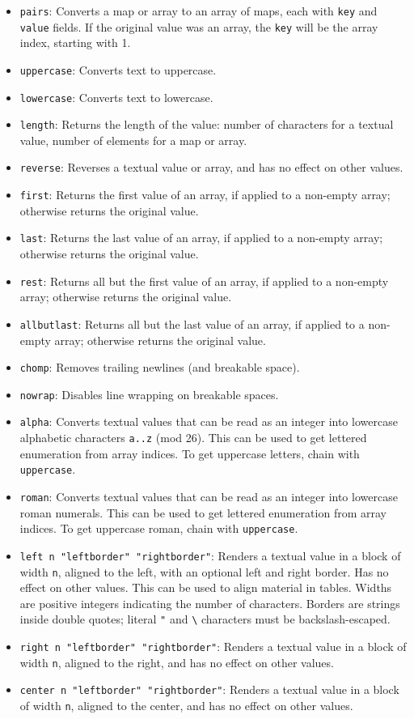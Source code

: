 \documentclass[
  b5paper
]{book}
\begin{document}
\begin{itemize}
\item
  \texttt{pairs}: Converts a map or array to an array of maps, each with
  \texttt{key} and \texttt{value} fields. If the original value was an
  array, the \texttt{key} will be the array index, starting with 1.
\item
  \texttt{uppercase}: Converts text to uppercase.
\item
  \texttt{lowercase}: Converts text to lowercase.
\item
  \texttt{length}: Returns the length of the value: number of characters
  for a textual value, number of elements for a map or array.
\item
  \texttt{reverse}: Reverses a textual value or array, and has no effect
  on other values.
\item
  \texttt{first}: Returns the first value of an array, if applied to a
  non-empty array; otherwise returns the original value.
\item
  \texttt{last}: Returns the last value of an array, if applied to a
  non-empty array; otherwise returns the original value.
\item
  \texttt{rest}: Returns all but the first value of an array, if applied
  to a non-empty array; otherwise returns the original value.
\item
  \texttt{allbutlast}: Returns all but the last value of an array, if
  applied to a non-empty array; otherwise returns the original value.
\item
  \texttt{chomp}: Removes trailing newlines (and breakable space).
\item
  \texttt{nowrap}: Disables line wrapping on breakable spaces.
\item
  \texttt{alpha}: Converts textual values that can be read as an integer
  into lowercase alphabetic characters \texttt{a..z} (mod 26). This can
  be used to get lettered enumeration from array indices. To get
  uppercase letters, chain with \texttt{uppercase}.
\item
  \texttt{roman}: Converts textual values that can be read as an integer
  into lowercase roman numerals. This can be used to get lettered
  enumeration from array indices. To get uppercase roman, chain with
  \texttt{uppercase}.
\item
  \texttt{left\ n\ "leftborder"\ "rightborder"}: Renders a textual value
  in a block of width \texttt{n}, aligned to the left, with an optional
  left and right border. Has no effect on other values. This can be used
  to align material in tables. Widths are positive integers indicating
  the number of characters. Borders are strings inside double quotes;
  literal \texttt{"} and \texttt{\textbackslash{}} characters must be
  backslash-escaped.
\item
  \texttt{right\ n\ "leftborder"\ "rightborder"}: Renders a textual
  value in a block of width \texttt{n}, aligned to the right, and has no
  effect on other values.
\item
  \texttt{center\ n\ "leftborder"\ "rightborder"}: Renders a textual
  value in a block of width \texttt{n}, aligned to the center, and has
  no effect on other values.
\end{itemize}
\end{document}
